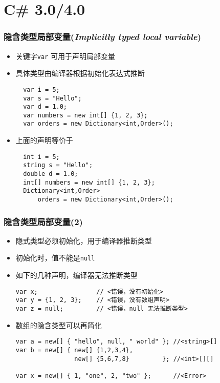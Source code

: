 
\section{C\# 3.0/4.0}

\begin{frame}[fragile]
\frametitle{隐含类型局部变量(\textit{Implicitly typed local variable})}

\begin{itemize}
\item 关键字\texttt{var} 可用于声明局部变量
\item 具体类型由编译器根据初始化表达式推断
\begin{lstlisting}
  var i = 5;
  var s = "Hello";
  var d = 1.0;
  var numbers = new int[] {1, 2, 3};
  var orders = new Dictionary<int,Order>();
\end{lstlisting}

\item 上面的声明等价于
\begin{lstlisting}
  int i = 5;
  string s = "Hello";
  double d = 1.0;
  int[] numbers = new int[] {1, 2, 3};
  Dictionary<int,Order>
      orders = new Dictionary<int,Order>();
\end{lstlisting}
\end{itemize}
\end{frame}

\begin{frame}[fragile]
\frametitle{隐含类型局部变量(2)}
\begin{itemize}
\item 隐式类型必须初始化，用于编译器推断类型
\item 初始化时，值不能是\texttt{null}
\item 如下的几种声明，编译器无法推断类型
\begin{lstlisting}[escapeinside=<>]
var x;                // <错误，没有初始化>
var y = {1, 2, 3};    // <错误，没有数组声明>
var z = null;         // <错误，null 无法推断类型>
\end{lstlisting}

\item 数组的隐含类型可以再简化
\begin{lstlisting}
var a = new[] { "hello", null, " world" }; //<string>[]
var b = new[] { new[] {1,2,3,4},
                new[] {5,6,7,8}         }; //<int>[][]

var x = new[] { 1, "one", 2, "two" };      //<Error>
\end{lstlisting}
\end{itemize}
\end{frame}

